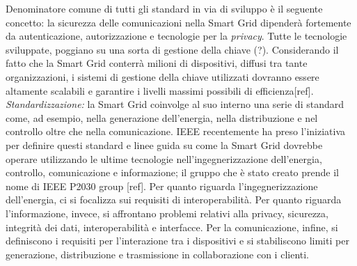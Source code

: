 Denominatore comune di tutti gli standard in via di sviluppo è il seguente concetto: la sicurezza delle comunicazioni nella Smart Grid dipenderà fortemente da autenticazione, autorizzazione e tecnologie per la \emph{privacy}. \newline Tutte le tecnologie sviluppate, poggiano su una sorta di gestione della chiave (?). Considerando il fatto che la Smart Grid conterrà milioni di dispositivi, diffusi tra tante organizzazioni, i sistemi di gestione della chiave utilizzati dovranno essere altamente scalabili e garantire i livelli massimi possibili di efficienza[ref].
\newline \newline
\textit{Standardizzazione:} la Smart Grid coinvolge al suo interno una serie di standard come, ad esempio, nella generazione dell'energia, nella distribuzione e nel controllo oltre che nella comunicazione. IEEE recentemente ha preso l'iniziativa per definire questi standard e linee guida su come la Smart Grid dovrebbe operare utilizzando le ultime tecnologie nell'ingegnerizzazione dell'energia, controllo, comunicazione e informazione; il gruppo che è stato creato prende il nome di IEEE P2030 group [ref]. \newline Per quanto riguarda l'ingegnerizzazione dell'energia, ci si focalizza sui requisiti di interoperabilità. Per quanto riguarda l'informazione, invece, si affrontano problemi relativi alla privacy, sicurezza, integrità dei dati, interoperabilità e interfacce. Per la comunicazione, infine, si definiscono i requisiti per l'interazione tra i dispositivi e si stabiliscono limiti per generazione, distribuzione e trasmissione in collaborazione con i clienti.
 
\newpage
